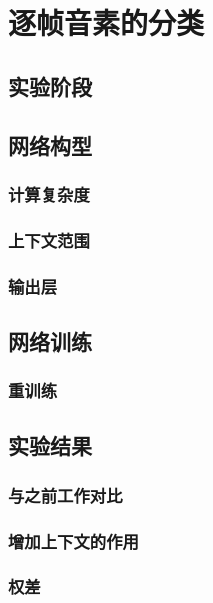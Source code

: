 \chapter{逐帧音素的分类}
\section{实验阶段}
\section{网络构型}
\subsection{计算复杂度}
\subsection{上下文范围}
\subsection{输出层}
\section{网络训练}
\subsection{重训练}
\section{实验结果}
\subsection{与之前工作对比}
\subsection{增加上下文的作用}
\subsection{权差}
